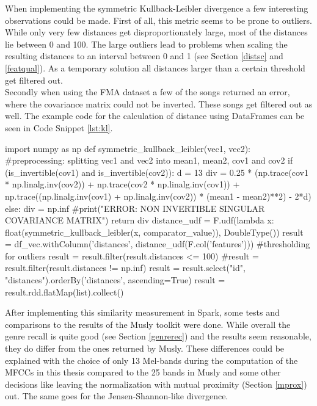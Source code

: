 When implementing the symmetric Kullback-Leibler divergence a few interesting observations could be made. First of all, this metric seems to be prone to outliers. While only very few distances get disproportionately large, most of the distances lie between 0 and 100. The large outliers lead to problems when scaling the resulting distances to an interval between 0 and 1 (see Section \ref{distsc} and \ref{featqual}). As a temporary solution all distances larger than a certain threshold get filtered out.\\ 
Secondly when using the FMA dataset a few of the songs returned an error, where the covariance matrix could not be inverted. 
These songs get filtered out as well. The example code for the calculation of distance using DataFrames can be seen in Code Snippet \ref{lst:kl}. 

\begin{pythonCode}[frame=single,label={lst:kl},caption={Kullback-Leibler Divergence},captionpos=b]
import numpy as np
def symmetric_kullback_leibler(vec1, vec2):
	#preprocessing: splitting vec1 and vec2 into mean1, mean2, cov1 and cov2
	if (is_invertible(cov1) and is_invertible(cov2)):
		d = 13
		div = 0.25 * (np.trace(cov1 * np.linalg.inv(cov2)) + 
			np.trace(cov2 * np.linalg.inv(cov1)) + 
			np.trace((np.linalg.inv(cov1) + 
			np.linalg.inv(cov2)) * (mean1 - mean2)**2) - 2*d)
	else: 
		div = np.inf
		#print("ERROR: NON INVERTIBLE SINGULAR COVARIANCE MATRIX\n")  
	return div
distance_udf = F.udf(lambda x: float(symmetric_kullback_leibler(x, comparator_value)), DoubleType())
result = df_vec.withColumn('distances', distance_udf(F.col('features')))
#thresholding for outliers
result = result.filter(result.distances <= 100)  
#result = result.filter(result.distances != np.inf)        
result = result.select("id", "distances").orderBy('distances', ascending=True)
result = result.rdd.flatMap(list).collect()
\end{pythonCode}

\noindent After implementing this similarity measurement in Spark, some tests and comparisons to the results of the Musly toolkit \cite{musly1} were done. While overall the genre recall is quite good (see Section \ref{genrerec}) and the results seem reasonable, they do differ from the ones returned by Musly. 
These differences could be explained with the choice of only 13 Mel-bands during the computation of the MFCCs in this thesis compared to the 25 bands in Musly \cite{musly1} and some other decisions like leaving the normalization with mutual proximity (Section \ref{mprox}) out. The same goes for the Jensen-Shannon-like divergence. 


